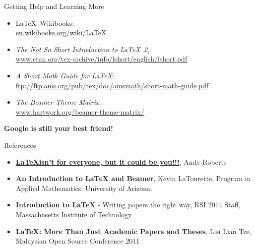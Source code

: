 
\begin{frame}{Getting Help and Learning More}
\begin{itemize}
\item \LaTeX~Wikibooks:\\
	  {\small\url{en.wikibooks.org/wiki/LaTeX}}
\item \emph{The Not So Short Introduction to \LaTeX\ 2}$_\varepsilon$:\\
      {\small\url{www.ctan.org/tex-archive/info/lshort/english/lshort.pdf}}
\item \emph{A Short Math Guide for \LaTeX}:\\
      {\small\url{ftp://ftp.ams.org/pub/tex/doc/amsmath/short-math-guide.pdf}}
\item \emph{The Beamer Theme Matrix}:\\
	  {\small\url{www.hartwork.org/beamer-theme-matrix/}}
\end{itemize}
\textbf{Google is still your best friend!}
\end{frame}



\begin{frame}{References}
\begin{itemize}%
\item \href{http://tug.org/pracjourn/2006-2/roberts/}{\textbf{\LaTeX \thinspace isn't for everyone, but it could be you!!!}}, Andy Roberts

\item \textbf{An Introduction to LaTeX and Beamer}, Kevin LaTourette, Program in Applied Mathematics, University of Arizona.

\item \textbf{Introduction to \LaTeX} - Writing papers the right way,  RSI 2014 Staff, Massachusetts Institute of Technology

\item \textbf{\LaTeX: More Than Just Academic Papers and Theses}, \textsc{Lim} Lian Tze, Malaysian Open Source Conference 2011
\end{itemize}
\end{frame}


